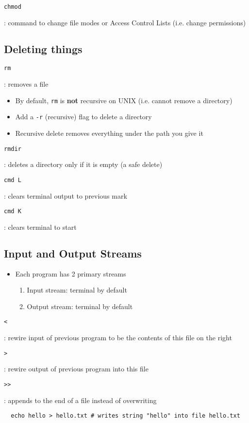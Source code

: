 \documentclass[letterpaper,12pt]{article}
\newcommand*{\lstitem}[1]{
  \setbox0\hbox{\lstinline{#1}}
  \item[\usebox0]
}
\begin{document}
\begin{description}
 \lstitem{chmod}: command to change file modes or Access Control Lists (i.e. change permissions)
\end{description}

\subsection{Deleting things}
\begin{description}
 \lstitem{rm}: removes a file
\end{description}

\begin{itemize}
 \item By default, \lstinline{rm} is \textbf{not} recursive on UNIX (i.e. cannot remove a directory)
 \item Add a \lstinline{-r} (recursive) flag to delete a directory
 \item Recursive delete removes everything under the path you give it
\end{itemize}

\begin{description}
 \lstitem{rmdir}: deletes a directory only if it is empty (a safe delete)
 \lstitem{cmd L}: clears terminal output to previous mark
 \lstitem{cmd K}: clears terminal to start
\end{description}

\subsection{Input and Output Streams}
\begin{itemize}
 \item Each program has 2 primary streams
       \begin{enumerate}
        \item Input stream: terminal by default
        \item Output stream: terminal by default
       \end{enumerate}
\end{itemize}

\begin{description}
 \lstitem{<}: rewire input of previous program to be the contents of this file on the right
 \lstitem{>}: rewire output of previous program into this file
 \lstitem{>>}: appends to the end of a file instead of overwriting
\end{description}

\begin{lstlisting}
  echo hello > hello.txt # writes string "hello" into file hello.txt
\end{lstlisting}
\end{document}
